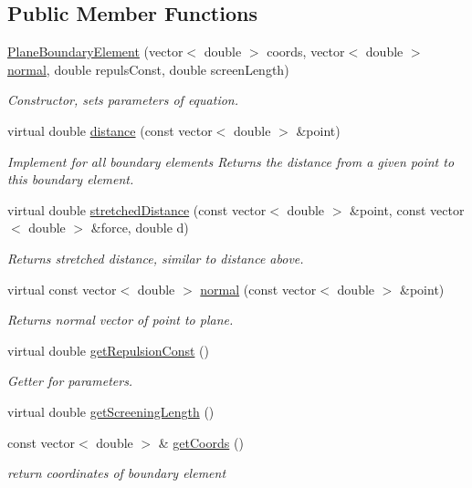 \subsection*{Public Member Functions}
\begin{DoxyCompactItemize}
\item 
\hyperlink{classPlaneBoundaryElement_a27539f30d1a91ba71e7b121d03d98bf3}{Plane\+Boundary\+Element} (vector$<$ double $>$ coords, vector$<$ double $>$ \hyperlink{classPlaneBoundaryElement_a0d87ae7390cd7fcfa2c7769e6212ee97}{normal}, double repuls\+Const, double screen\+Length)
\begin{DoxyCompactList}\small\item\em Constructor, sets parameters of equation. \end{DoxyCompactList}\item 
virtual double \hyperlink{classPlaneBoundaryElement_ad35d384337c44f4bf5e5b243cf9cda88}{distance} (const vector$<$ double $>$ \&point)
\begin{DoxyCompactList}\small\item\em Implement for all boundary elements Returns the distance from a given point to this boundary element. \end{DoxyCompactList}\item 
virtual double \hyperlink{classPlaneBoundaryElement_a7855fefca7c75e466abf4ae9d6883fb2}{stretched\+Distance} (const vector$<$ double $>$ \&point, const vector$<$ double $>$ \&force, double d)
\begin{DoxyCompactList}\small\item\em Returns stretched distance, similar to distance above. \end{DoxyCompactList}\item 
virtual const vector$<$ double $>$ \hyperlink{classPlaneBoundaryElement_a0d87ae7390cd7fcfa2c7769e6212ee97}{normal} (const vector$<$ double $>$ \&point)
\begin{DoxyCompactList}\small\item\em Returns normal vector of point to plane. \end{DoxyCompactList}\item 
virtual double \hyperlink{classPlaneBoundaryElement_a022862630bad9bf77b6de4057474876a}{get\+Repulsion\+Const} ()
\begin{DoxyCompactList}\small\item\em Getter for parameters. \end{DoxyCompactList}\item 
virtual double \hyperlink{classPlaneBoundaryElement_a81c5691717216f8602cc2300c603e253}{get\+Screening\+Length} ()
\item 
const vector$<$ double $>$ \& \hyperlink{classBoundaryElement_ace76817d750bb44c11edd918f1a8b78f}{get\+Coords} ()
\begin{DoxyCompactList}\small\item\em return coordinates of boundary element \end{DoxyCompactList}\end{DoxyCompactItemize}
